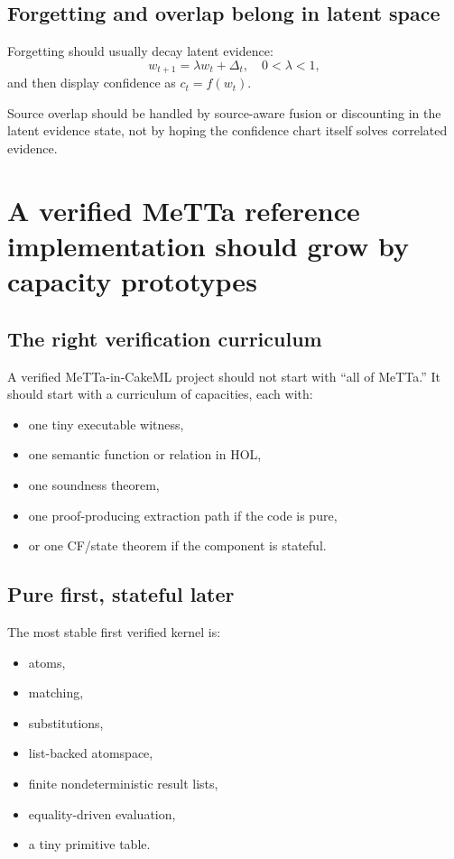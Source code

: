 \documentclass[11pt]{article}
\begin{document}
\subsection{Forgetting and overlap belong in latent space}

Forgetting should usually decay latent evidence:
\[
w_{t+1} = \lambda w_t + \Delta_t,
\quad 0<\lambda<1,
\]
and then display confidence as \(c_t=f(w_t)\).

Source overlap should be handled by source-aware fusion or discounting in the latent evidence state, not by hoping the confidence chart itself solves correlated evidence.

\section{A verified MeTTa reference implementation should grow by capacity prototypes}

\subsection{The right verification curriculum}

A verified MeTTa-in-CakeML project should not start with ``all of MeTTa.'' It should start with a curriculum of capacities, each with:
\begin{itemize}
    \item one tiny executable witness,
    \item one semantic function or relation in HOL,
    \item one soundness theorem,
    \item one proof-producing extraction path if the code is pure,
    \item or one CF/state theorem if the component is stateful.
\end{itemize}

\subsection{Pure first, stateful later}

The most stable first verified kernel is:
\begin{itemize}
    \item atoms,
    \item matching,
    \item substitutions,
    \item list-backed atomspace,
    \item finite nondeterministic result lists,
    \item equality-driven evaluation,
    \item a tiny primitive table.
\end{itemize}
\end{document}
